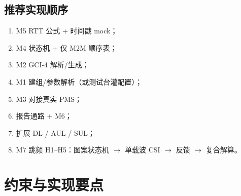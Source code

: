 \documentclass[11pt,a4paper]{ctexart}
\begin{document}
\subsection{推荐实现顺序}

\begin{enumerate}[nosep]
  \item M5 RTT 公式 + 时间戳 mock；
  \item M4 状态机 + 仅 M2M 顺序表；
  \item M2 GCI-4 解析/生成；
  \item M1 建组/参数解析（或测试台灌配置）；
  \item M3 对接真实 PMS；
  \item 报告通路 + M6；
  \item 扩展 DL / AUL / SUL；
  \item M7 跳频 H1--H5：图案状态机 $\rightarrow$ 单载波 CSI $\rightarrow$ 反馈 $\rightarrow$ 复合解算。
\end{enumerate}

\section{约束与实现要点}
\end{document}
